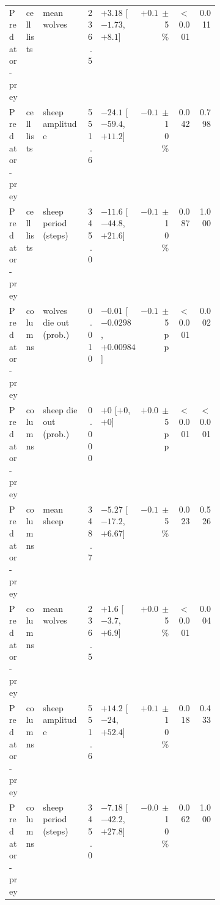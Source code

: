 \begin{longtable}{ll>{\raggedright\arraybackslash}p{0.21\linewidth}r>{\raggedright\arraybackslash}p{0.19\linewidth}rrrr}
Predator-prey & cell lists & mean wolves & 236.5 & $+3.18$ [$-1.73$, $+8.1$] & $+0.17$ & $\pm$5\% & $<$0.001 & 0.011 \\
Predator-prey & cell lists & sheep amplitude & 551.6 & $-24.1$ [$-59.4$, $+11.2$] & $-0.19$ & $\pm$10\% & 0.042 & 0.798 \\
Predator-prey & cell lists & sheep period (steps) & 345.0 & $-11.6$ [$-44.8$, $+21.6$] & $-0.10$ & $\pm$10\% & 0.087 & 1.000 \\
Predator-prey & columns & wolves die out (prob.) & 0.010 & $-0.01$ [$-0.0298$, $+0.00984$] & $-0.14$ & $\pm$5 pp & $<$0.001 & 0.002 \\
Predator-prey & columns & sheep die out (prob.) & 0.000 & $+0$ [$+0$, $+0$] & $+0.00$ & $\pm$5 pp & $<$0.001 & $<$0.001 \\
Predator-prey & columns & mean sheep & 348.7 & $-5.27$ [$-17.2$, $+6.67$] & $-0.12$ & $\pm$5\% & 0.023 & 0.526 \\
Predator-prey & columns & mean wolves & 236.5 & $+1.6$ [$-3.7$, $+6.9$] & $+0.09$ & $\pm$5\% & $<$0.001 & 0.004 \\
Predator-prey & columns & sheep amplitude & 551.6 & $+14.2$ [$-24$, $+52.4$] & $+0.11$ & $\pm$10\% & 0.018 & 0.433 \\
Predator-prey & columns & sheep period (steps) & 345.0 & $-7.18$ [$-42.2$, $+27.8$] & $-0.06$ & $\pm$10\% & 0.062 & 1.000 \\
\end{longtable}
